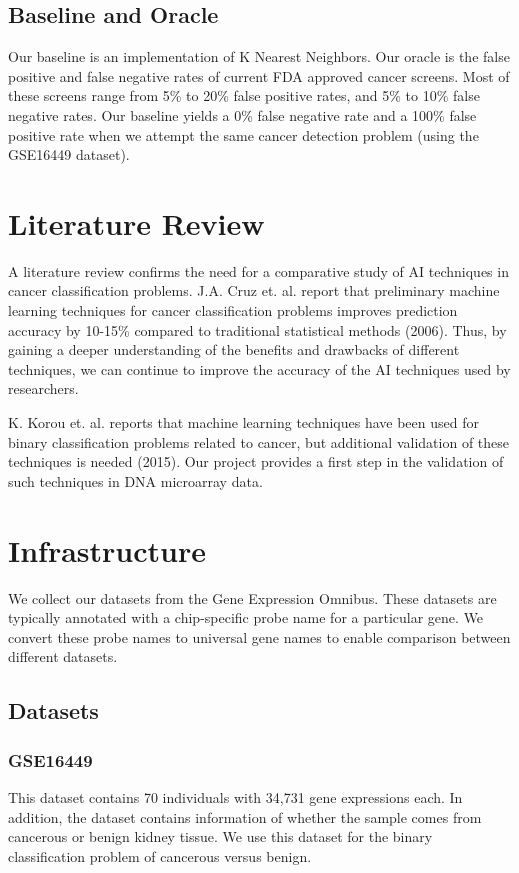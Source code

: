\documentclass[12pt]{scrartcl}
\begin{document}
    \subsection{Baseline and Oracle}
Our baseline is an implementation of K Nearest Neighbors. Our oracle is the false positive and false negative rates of current FDA approved cancer screens. Most of these screens range from 5\% to 20\% false positive rates, and 5\% to 10\% false negative rates. Our baseline yields a 0\% false negative rate and a 100\% false positive rate when we attempt the same cancer detection problem (using the GSE16449 dataset). 

    \section{Literature Review}
    A literature review confirms the need for a comparative study of AI techniques in cancer classification problems. J.A. Cruz et. al. report that preliminary machine learning techniques for cancer classification problems improves prediction accuracy by 10-15\% compared to traditional statistical methods (2006). Thus, by gaining a deeper understanding of the benefits and drawbacks of different techniques, we can continue to improve the accuracy of the AI techniques used by researchers.
    
    K. Korou et. al. reports that machine learning techniques have been used for binary classification problems related to cancer, but additional validation of these techniques is needed (2015). Our project provides a first step in the validation of such techniques in DNA microarray data.
    \section{Infrastructure}
    We collect our datasets from the Gene Expression Omnibus. These datasets are typically annotated with a chip-specific probe name for a particular gene. We convert these probe names to universal gene names to enable comparison between different datasets. 
    \subsection{Datasets}
    \subsubsection{GSE16449}
    This dataset contains 70 individuals with 34,731 gene expressions each. In addition, the dataset contains information of whether the sample comes from cancerous or benign kidney tissue. We use this dataset for the binary classification problem of cancerous versus benign.
\end{document}
